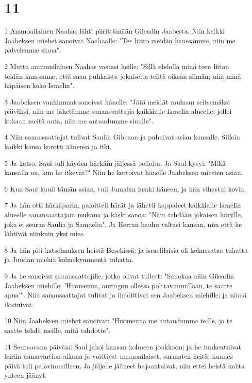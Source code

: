 \chapter{11}

\par 1 Ammonilainen Naahas lähti piirittämään Gileadin Jaabesta. Niin kaikki Jaabeksen miehet sanoivat Naahaalle: "Tee liitto meidän kanssamme, niin me palvelemme sinua".
\par 2 Mutta ammonilainen Naahas vastasi heille: "Sillä ehdolla minä teen liiton teidän kanssanne, että saan puhkaista jokaiselta teiltä oikean silmän; niin minä häpäisen koko Israelin".
\par 3 Jaabeksen vanhimmat sanoivat hänelle: "Jätä meidät rauhaan seitsemäksi päiväksi, niin me lähetämme sanansaattajia kaikkialle Israelin alueelle; jollei kukaan meitä auta, niin me antaudumme sinulle".
\par 4 Niin sanansaattajat tulivat Saulin Gibeaan ja puhuivat asian kansalle. Silloin kaikki kansa korotti äänensä ja itki.
\par 5 Ja katso, Saul tuli käyden härkäin jäljessä pellolta. Ja Saul kysyi: "Mikä kansalla on, kun he itkevät?" Niin he kertoivat hänelle Jaabeksen miesten asian.
\par 6 Kun Saul kuuli tämän asian, tuli Jumalan henki häneen, ja hän vihastui kovin.
\par 7 Ja hän otti härkäparin, paloitteli härät ja lähetti kappaleet kaikkialle Israelin alueelle sanansaattajain mukana ja käski sanoa: "Näin tehdään jokaisen härjille, joka ei seuraa Saulia ja Samuelia". Ja Herran kauhu valtasi kansan, niin että he lähtivät niinkuin yksi mies.
\par 8 Ja hän piti katselmuksen heistä Besekissä; ja israelilaisia oli kolmesataa tuhatta ja Juudan miehiä kolmekymmentä tuhatta.
\par 9 Ja he sanoivat sanansaattajille, jotka olivat tulleet: "Sanokaa näin Gileadin Jaabeksen miehille: 'Huomenna, auringon ollessa polttavimmillaan, te saatte apua'". Niin sanansaattajat tulivat ja ilmoittivat sen Jaabeksen miehille; ja nämä ilostuivat.
\par 10 Niin Jaabeksen miehet sanoivat: "Huomenna me antaudumme teille, ja te saatte tehdä meille, mitä tahdotte".
\par 11 Seuraavana päivänä Saul jakoi kansan kolmeen joukkoon; ja he tunkeutuivat leiriin aamuvartion aikana ja voittivat ammonilaiset, surmaten heitä, kunnes päivä tuli palavimmilleen. Ja jäljelle jääneet hajaantuivat, niin ettei heistä kahta yhteen jäänyt.
